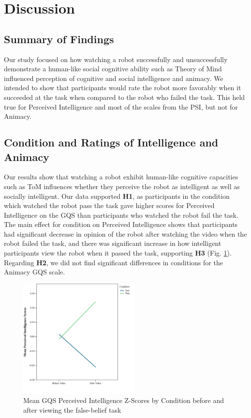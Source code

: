 \documentclass[letterpaper, 10 pt, conference]{ieeeconf}  %
\begin{document}
\section{Discussion}
\subsection{Summary of Findings}
Our study focused on how watching a robot successfully and unsuccessfully demonstrate a human-like social cognitive ability such as Theory of Mind influenced perception of cognitive and social intelligence and animacy. We intended to show that participants would rate the robot more favorably when it succeeded at the task when compared to the robot who failed the task. This held true for Perceived Intelligence and most of the scales from the PSI, but not for Animacy.

\subsection{Condition and Ratings of Intelligence and Animacy}
Our results show that watching a robot exhibit human-like cognitive capacities such as ToM influences whether they perceive the robot as intelligent as well as socially intelligent. Our data supported \textbf{H1}, as participants in the condition which watched the robot pass the task gave higher scores for Perceived Intelligence on the GQS than participants who watched the robot fail the task. The main effect for condition on Perceived Intelligence shows that participants had significant decrease in opinion of the robot after watching the video when the robot failed the task, and there was significant increase in how intelligent participants view the robot when it passed the task, supporting \textbf{H3} (Fig. \ref{fig:Intell-Before-After}). Regarding \textbf{H2}, we did not find significant differences in conditions for the Animacy GQS scale. 

\begin{figure}[h]
\centering
\includegraphics[height=6cm]{revised-before-after.jpg}
\caption{Mean GQS Perceived Intelligence Z-Scores by Condition before and after viewing the false-belief task\label{fig:Intell-Before-After}}
\end{figure}
\end{document}
